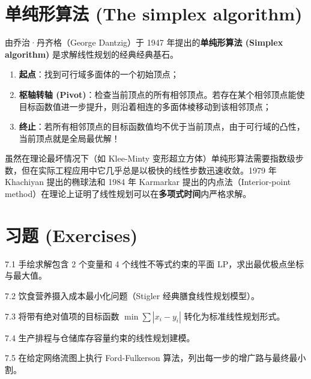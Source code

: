 \section{单纯形算法 (The simplex algorithm)}

由乔治·丹齐格（George Dantzig）于 1947 年提出的\textbf{单纯形算法 (Simplex algorithm)} 是求解线性规划的经典经典基石。
\begin{enumerate}
    \item \textbf{起点}：找到可行域多面体的一个初始顶点；
    \item \textbf{枢轴转轴 (Pivot)}：检查当前顶点的所有相邻顶点。若存在某个相邻顶点能使目标函数值进一步提升，则沿着相连的多面体棱移动到该相邻顶点；
    \item \textbf{终止}：若所有相邻顶点的目标函数值均不优于当前顶点，由于可行域的凸性，当前顶点就是全局最优解！
\end{enumerate}

虽然在理论最坏情况下（如 Klee-Minty 变形超立方体）单纯形算法需要指数级步数，但在实际工程应用中它几乎总是以极快的线性步数迅速收敛。1979 年 Khachiyan 提出的椭球法和 1984 年 Karmarkar 提出的内点法（Interior-point method）在理论上证明了线性规划可以在\textbf{多项式时间}内严格求解。

\newpage
\section*{习题 (Exercises)}

\begin{exercise}{7.1}
手绘求解包含 2 个变量和 4 个线性不等式约束的平面 LP，求出最优极点坐标与最大值。
\end{exercise}

\begin{exercise}{7.2}
饮食营养摄入成本最小化问题（Stigler 经典膳食线性规划模型）。
\end{exercise}

\begin{exercise}{7.3}
将带有绝对值项的目标函数 $\min \sum |x_i - y_i|$ 转化为标准线性规划形式。
\end{exercise}

\begin{exercise}{7.4}
生产排程与仓储库存容量约束的线性规划建模。
\end{exercise}

\begin{exercise}{7.5}
在给定网络流图上执行 Ford-Fulkerson 算法，列出每一步的增广路与最终最小割。
\end{exercise}

